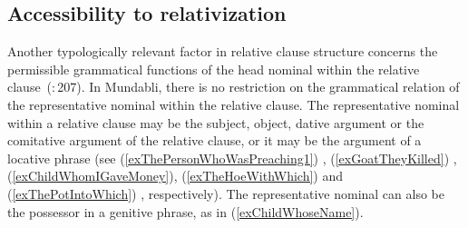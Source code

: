 \documentclass[10pt,twoside]{article}
\newcommand{\gl}[1]{`#1'}
\def\VSP{\vspace{0pt}}
\newcommand{\cl}[1]{{\sc cl#1}}
\newcommand{\citepp}[2]{(\citealp{#1}:\,{#2})}
\newcommand{\pref}[1]{(\ref{#1})}
\begin{document}
%
%
%
%
%

\subsection{Accessibility to relativization}\label{secMundabliAccessibility}

Another typologically relevant factor in relative clause structure concerns the permissible
grammatical functions of the head nominal within the relative clause~\citepp{andrews:2007}{207}. 
In Mundabli, there is no restriction on the grammatical relation of the representative nominal within the relative 
clause. The representative nominal within a relative clause may be the subject, object, dative argument or 
the comitative argument of the relative clause, or it may be the argument of a locative phrase 
(see \pref{exThePersonWhoWasPreaching1}
, \pref{exGoatTheyKilled}
, \pref{exChildWhomIGaveMoney}, \pref{exTheHoeWithWhich} and \pref{exThePotIntoWhich}
, respectively). The representative 
nominal can also be the possessor in a genitive phrase, as in \pref{exChildWhoseName}.
\end{document}
